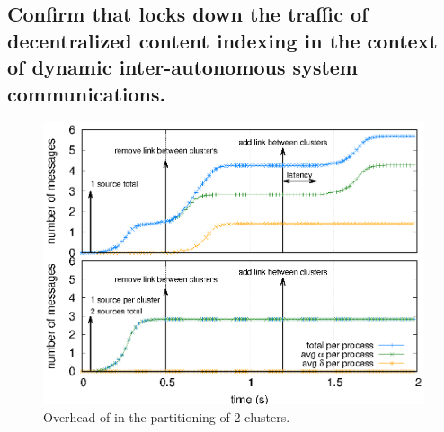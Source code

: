 
\subsection{Confirm that \NAME locks down the traffic of decentralized content
  indexing in the context of dynamic inter-autonomous system
  communications.}

\begin{figure}
  \centering\includegraphics[width=0.99\columnwidth]{img/as_cast_geant.eps}
  \caption{\label{fig:geant}Overhead of \NAME in the partitioning of 2 clusters.}
\end{figure}

